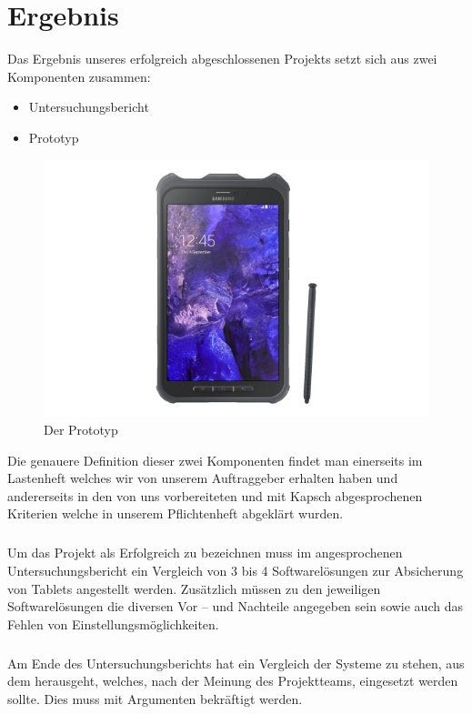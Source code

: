 \chapter{Ergebnis}
Das Ergebnis unseres erfolgreich abgeschlossenen Projekts setzt sich aus zwei Komponenten zusammen:
\begin{itemize}
	\item Untersuchungsbericht
	\item Prototyp
\end{itemize}
\begin{figure}[H]
\centering
\includegraphics[scale=1.0]{Images/prototyp}
\caption{Der Prototyp}
\end{figure}
Die genauere Definition dieser zwei Komponenten findet man einerseits im Lastenheft welches wir von unserem Auftraggeber erhalten haben und andererseits in den von uns vorbereiteten und mit Kapsch abgesprochenen Kriterien welche in unserem Pflichtenheft abgeklärt wurden. 
\paragraph*{}
Um das Projekt als Erfolgreich zu bezeichnen muss im angesprochenen Untersuchungsbericht ein Vergleich von 3 bis 4 Softwarelösungen zur Absicherung von Tablets angestellt werden. Zusätzlich müssen zu den jeweiligen Softwarelösungen die diversen Vor – und Nachteile angegeben sein sowie auch das Fehlen von Einstellungsmöglichkeiten.
\paragraph*{}
Am Ende des Untersuchungsberichts hat ein Vergleich der Systeme zu stehen, aus dem herausgeht, welches, nach der Meinung des Projektteams, eingesetzt werden sollte. Dies muss mit Argumenten bekräftigt werden.
